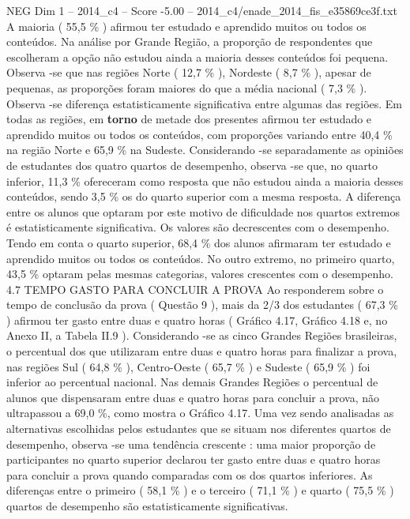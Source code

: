 \begin{textsample}{NEG Dim 1 – 2014\_c4 – Score -5.00 – 2014\_c4/enade\_2014\_fis\_e35869ce3f.txt}
A maioria ( 55,5 \% ) afirmou ter estudado e aprendido muitos ou todos os conteúdos.
Na análise por Grande Região, a proporção de respondentes que escolheram a opção não estudou ainda a maioria desses conteúdos foi pequena.
Observa -se que nas regiões Norte ( 12,7 \% ), Nordeste ( 8,7 \% ), apesar de pequenas, as proporções foram maiores do que a média nacional ( 7,3 \% ).
Observa -se diferença estatisticamente significativa entre algumas das regiões.
Em todas as regiões, em \textbf{torno} de metade dos presentes afirmou ter estudado e aprendido muitos ou todos os conteúdos, com proporções variando entre 40,4 \% na região Norte e 65,9 \% na Sudeste.
Considerando -se separadamente as opiniões de estudantes dos quatro quartos de desempenho, observa -se que, no quarto inferior, 11,3 \% ofereceram como resposta que não estudou ainda a maioria desses conteúdos, sendo 3,5 \% os do quarto superior com a mesma resposta.
A diferença entre os alunos que optaram por este motivo de dificuldade nos quartos extremos é estatisticamente significativa.
Os valores são decrescentes com o desempenho.
Tendo em conta o quarto superior, 68,4 \% dos alunos afirmaram ter estudado e aprendido muitos ou todos os conteúdos.
No outro extremo, no primeiro quarto, 43,5 \% optaram pelas mesmas categorias, valores crescentes com o desempenho. 4.7 TEMPO GASTO PARA CONCLUIR A PROVA Ao responderem sobre o tempo de conclusão da prova ( Questão 9 ), mais da 2/3 dos estudantes ( 67,3 \% ) afirmou ter gasto entre duas e quatro horas ( Gráfico 4.17, Gráfico 4.18 e, no Anexo II, a Tabela II.9 ).
Considerando -se as cinco Grandes Regiões brasileiras, o percentual dos que utilizaram entre duas e quatro horas para finalizar a prova, nas regiões Sul ( 64,8 \% ), Centro-Oeste ( 65,7 \% ) e Sudeste ( 65,9 \% ) foi inferior ao percentual nacional.
Nas demais Grandes Regiões o percentual de alunos que dispensaram entre duas e quatro horas para concluir a prova, não ultrapassou a 69,0 \%, como mostra o Gráfico 4.17.
Uma vez sendo analisadas as alternativas escolhidas pelos estudantes que se situam nos diferentes quartos de desempenho, observa -se uma tendência crescente : uma maior proporção de participantes no quarto superior declarou ter gasto entre duas e quatro horas para concluir a prova quando comparadas com os dos quartos inferiores.
As diferenças entre o primeiro ( 58,1 \% ) e o terceiro ( 71,1 \% ) e quarto ( 75,5 \% ) quartos de desempenho são estatisticamente significativas.

\end{textsample}
